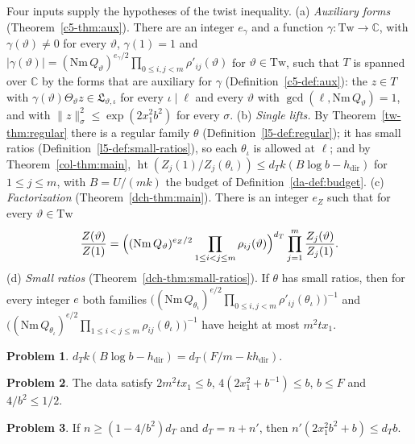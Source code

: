 \documentclass[reqno]{amsart}
\theoremstyle{definition}
\newtheorem{problem}{Problem}[section]
\theoremstyle{plain}
\newcommand{\C}{{\mathbb{C}}}
\newcommand{\Lc}{\mathfrak L}
\newcommand{\hdir}{h_{\mathrm{dir}}}
\newcommand{\hgt}{\operatorname{ht}}
\begin{document}
Four inputs supply the hypotheses of the twist inequality.  (a) \emph{Auxiliary forms} (Theorem~\ref{c5-thm:aux}).  There are an integer \(e_\gamma\) and a function \(\gamma \colon \mathrm{Tw} \to \C\), with \(\gamma(\vartheta) \ne 0\) for every \(\vartheta\), \(\gamma(1) = 1\) and \(\lvert\gamma(\vartheta)\rvert = (\mathrm{Nm}\,Q_\vartheta)^{e_\gamma/2}\prod_{0 \le i, j < m} \rho'_{ij}(\vartheta)\) for \(\vartheta \in \mathrm{Tw}\), such that \(T\) is spanned over \(\C\) by the forms that are auxiliary for \(\gamma\) (Definition~\ref{c5-def:aux}): the \(z \in T\) with \(\gamma(\vartheta)\Theta_\vartheta z \in \Lc_{\vartheta,\iota}\) for every \(\iota \mid \ell\) and every \(\vartheta\) with \(\gcd(\ell, \mathrm{Nm}\,Q_\vartheta) = 1\), and with \(\lVert z \rVert_\sigma^2 \le \exp(2x_1^2b^2)\) for every \(\sigma\).  (b) \emph{Single lifts.}  By Theorem~\ref{tw-thm:regular} there is a regular family \(\theta\) (Definition~\ref{l5-def:regular}); it has small ratios (Definition~\ref{l5-def:small-ratios}), so each \(\theta_\iota\) is allowed at \(\ell\); and by Theorem~\ref{col-thm:main}, \(\hgt(Z_j(1)/Z_j(\theta_\iota)) \le d_T k(B\log b - \hdir)\) for \(1 \le j \le m\), with \(B = U/(mk)\) the budget of Definition~\ref{da-def:budget}.  (c) \emph{Factorization} (Theorem~\ref{dch-thm:main}).  There is an integer \(e_Z\) such that for every \(\vartheta \in \mathrm{Tw}\)
\[
  \frac{Z(\vartheta)}{Z(1)} = \Bigl( (\mathrm{Nm}\,Q_\vartheta)^{e_Z/2} \prod_{1 \le i < j \le m} \rho_{ij}(\vartheta) \Bigr)^{d_T} \prod_{j=1}^m \frac{Z_j(\vartheta)}{Z_j(1)} .
\]
(d) \emph{Small ratios} (Theorem~\ref{dch-thm:small-ratios}).  If \(\theta\) has small ratios, then for every integer \(e\) both families \(\bigl((\mathrm{Nm}\,Q_{\theta_\iota})^{e/2}\prod_{0 \le i,j < m} \rho'_{ij}(\theta_\iota)\bigr)^{-1}\) and \(\bigl((\mathrm{Nm}\,Q_{\theta_\iota})^{e/2}\prod_{1 \le i < j \le m} \rho_{ij}(\theta_\iota)\bigr)^{-1}\) have height at most \(m^2tx_1\).

\begin{problem}\label{pr:single}
\(d_T k(B\log b - \hdir) = d_T(F/m - k\hdir)\).
\end{problem}

\begin{problem}\label{pr:scales}
The data satisfy \(2m^2tx_1 \le b\), \(4(2x_1^2 + b^{-1}) \le b\), \(b \le F\) and \(4/b^2 \le 1/2\).
\end{problem}

\begin{problem}\label{pr:completion}
If \(n \ge (1 - 4/b^2)d_T\) and \(d_T = n + n'\), then \(n'(2x_1^2b^2 + b) \le d_T b\).
\end{problem}
\end{document}
